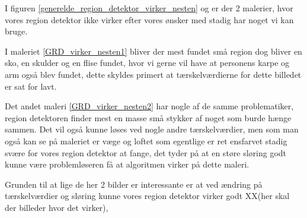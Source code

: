 I figuren \ref{generelde_region_detektor_virker_nesten} og er der 2
malerier, hvor vores region detektor ikke virker efter vores ønsker med
stadig har noget vi kan bruge. 

I maleriet \ref{GRD_virker_nesten1}
bliver der mest fundet små region dog bliver en sko, en skulder og en
flise fundet, hvor vi gerne vil have at personens karpe og arm også blev
fundet, dette skyldes primert at tærskelværdierne for dette billedet er
sat for lavt. 

Det andet maleri \ref{GRD_virker_nesten2} har nogle af de
samme problematiker, region detektoren finder mest en masse små stykker
af noget som burde hænge sammen. Det vil også kunne løses ved nogle
andre tærskelværdier, men som man også kan se på maleriet er væge og
loftet som egentlige er ret ensfarvet stadig svære for vores region
detektor at fange, det tyder på at en støre sløring godt kunne være
problemløseren få at algoritmen virker på dette maleri. 

Grunden til at lige de her 2 bilder er interessante er at ved ændring på
tærskelværdier og sløring kunne vores region detektor virker godt XX(her
skal der billeder hvor det virker), 

